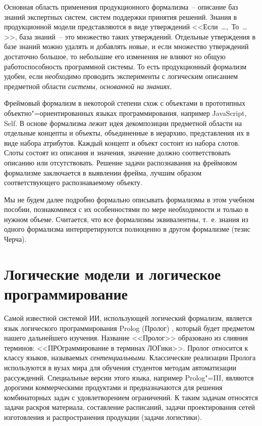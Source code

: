 \documentclass[a4paper,14pt, openany, twoside, final]{extbook} %
\begin{document}
Основная область применения продукционного формализма~-- описание баз знаний экспертных систем, систем поддержки принятия решений.  Знания в продукционной модели представляются в виде утверждений <<Если\ \ldots{},\ То\ \ldots{}>>, база знаний~-- это множество таких утверждений.  Отдельные утверждения в базе знаний можно удалять и добавлять новые, и если множество утверждений достаточно большое, то небольшие его изменения не влияют но общую работоспособность программной системы.  То есть продукционный формализм удобен, если необходимо проводить эксперименты с логическим описанием предметной области \emph{системы, основанной на знаниях}.

Фреймовый формализм в некоторой степени схож с объектами в прототипных объектно"=ориентированных языках программирования, например JavaScript, Self.  В основе формализма лежит идея декомпозиции предметной области на отдельные концепты и объекты, объединенные в иерархию, представления их в виде набора атрибутов.  Каждый концепт и объект состоит из набора слотов.  Слоты состоят из описания и значения, значение должно соответствовать описанию или отсутствовать.  Решение задачи распознавания на фреймовом формализме заключается в выявлении фрейма, лучшим образом соответствующего распознаваемому объекту.

Мы не будем далее подробно формально описывать формализмы в этом учебном пособии, познакомимся с их особенностями по мере необходимости и только в нужном объеме.  Считается, что все формализмы эквивалентны, т.~е. знания из одного формализма интерпретируются полноценно в другом формализме (тезис Черча).

\chapter{Логические модели и логическое программирование}

Самой известной системой ИИ, использующей логический формализм, является язык логического программирования \foreignlanguage{english}{Prolog} (Пролог) \cite{Bratko}, который будет предметом нашего дальнейшего изучения.  Название <<Пролог>> образовано из слияния терминов: <<ПРОграммирование в терминах ЛОГики>>. Пролог относится к классу языков, называемых \emph{сентенциальными}.  Классические реализации Пролога используются в вузах мира для обучения студентов методам автоматизации рассуждений.  Специальные версии этого языка, например Prolog"=III, являются дорогими коммерческими продуктами и предназначаются для решения комбинаторных задач с удовлетворением ограничений.  К таким задачам относятся задачи раскроя материала, составление расписаний, задачи проектирования сетей изготовления и распространения продукции (задачи логистики).
\end{document}
